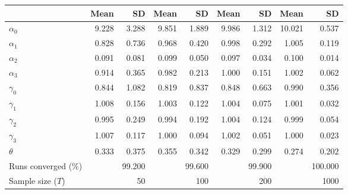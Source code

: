 
\begin{tabular}[t]{lrrrrrrrr}
\toprule
  & Mean & SD & Mean  & SD  & Mean   & SD   & Mean    & SD   \\
\midrule
$\alpha_{0}$ & 9.228 & 3.288 & 9.851 & 1.889 & 9.986 & 1.312 & 10.021 & 0.537\\
$\alpha_{1}$ & 0.828 & 0.736 & 0.968 & 0.420 & 0.998 & 0.292 & 1.005 & 0.119\\
$\alpha_{2}$ & 0.091 & 0.081 & 0.099 & 0.050 & 0.097 & 0.034 & 0.100 & 0.014\\
$\alpha_{3}$ & 0.914 & 0.365 & 0.982 & 0.213 & 1.000 & 0.151 & 1.002 & 0.062\\
$\gamma_{0}$ & 0.844 & 1.082 & 0.819 & 0.837 & 0.848 & 0.663 & 0.990 & 0.356\\
$\gamma_{1}$ & 1.008 & 0.156 & 1.003 & 0.122 & 1.004 & 0.075 & 1.001 & 0.032\\
$\gamma_{2}$ & 0.995 & 0.249 & 0.994 & 0.192 & 1.004 & 0.124 & 0.999 & 0.054\\
$\gamma_{3}$ & 1.007 & 0.117 & 1.000 & 0.094 & 1.002 & 0.051 & 1.000 & 0.023\\
$\theta$ & 0.333 & 0.375 & 0.355 & 0.342 & 0.329 & 0.299 & 0.274 & 0.202\\
Runs converged (\%) &  & 99.200 &  & 99.600 &  & 99.900 &  & 100.000\\
Sample size ($T$) &  & 50 &  & 100 &  & 200 &  & 1000\\
\bottomrule
\end{tabular}
